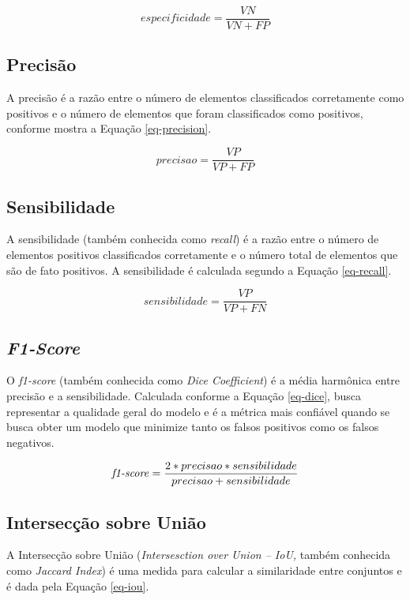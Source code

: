 \begin{equation}
especificidade = \frac{VN}{VN + FP}
\label{eq-specificity}
\end{equation}

\subsection{Precisão}
A precisão é a razão entre o número de elementos classificados corretamente como positivos e o número de elementos que foram classificados como positivos, conforme mostra a Equação \ref{eq-precision}.

\begin{equation}
precisao = \frac{VP}{VP + FP}
\label{eq-precision}
\end{equation}

\subsection{Sensibilidade}
A sensibilidade (também conhecida como \textit{recall}) é a razão entre o número de elementos positivos classificados corretamente e o número total de elementos que são de fato positivos. A sensibilidade é calculada segundo a Equação \ref{eq-recall}.

\begin{equation}
sensibilidade = \frac{VP}{VP + FN}
\label{eq-recall}
\end{equation}

\subsection{\textit{F1-Score}}
O \textit{f1-score} (também conhecida como \textit{Dice Coefficient}) é a média harmônica entre precisão e a sensibilidade. Calculada conforme a Equação \ref{eq-dice}, busca representar a qualidade geral do modelo e é a métrica mais confiável quando se busca obter um modelo que minimize tanto os falsos positivos como os falsos negativos.

\begin{equation}
\mbox{\textit{f1-score}} = \frac{2 * precisao * sensibilidade}{precisao + sensibilidade}
\label{eq-dice}
\end{equation}

\subsection{Intersecção sobre União}
A Intersecção sobre União (\emph{Intersesction over Union -- IoU,} também conhecida como \textit{Jaccard Index}) é uma medida para calcular a similaridade entre conjuntos e é dada pela Equação \ref{eq-iou}.


